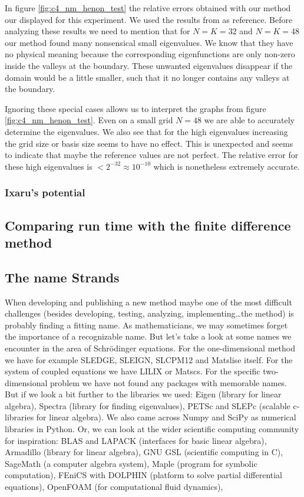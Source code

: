 In figure \ref{fig:c4_nm_henon_test} the relative errors obtained with our method our displayed for this experiment. We used the results from \cite{wang_new_2009} as reference. Before analyzing these results we need to mention that for $N = K = 32$ and $N = K = 48$ our method found many nonsensical small eigenvalues. We know that they have no physical meaning because the corresponding eigenfunctions are only non-zero inside the valleys at the boundary. These unwanted eigenvalues disappear if the domain would be a little smaller, such that it no longer contains any valleys at the boundary.

Ignoring these special cases allows us to interpret the graphs from figure \ref{fig:c4_nm_henon_test}. Even on a small grid $N = 48$ we are able to accurately determine the eigenvalues. We also see that for the high eigenvalues increasing the grid size or basis size seems to have no effect. This is unexpected and seems to indicate that maybe the reference values are not perfect. The relative error for these high eigenvalues is $< 2^{-32} \approx 10^{-10}$ which is nonetheless extremely accurate.

\subsubsection{Ixaru's potential}\label{sec:c4_numerical_ixaru}

\subsection{Comparing run time with the finite difference method}\label{sec:c4_nm_vs_fd}



\subsection{The name Strands}

When developing and publishing a new method maybe one of the most difficult challenges (besides developing, testing, analyzing, implementing\dots the method) is probably finding a fitting name. As mathematicians, we may sometimes forget the importance of a recognizable name. But let's take a look at some names we encounter in the area of Schrödinger equations. For the one-dimensional method we have for example SLEDGE, SLEIGN, SLCPM12 and Matslise itself. For the system of coupled equations we have LILIX or Matscs. For the specific two-dimensional problem we have not found any packages with memorable names. But if we look a bit further to the libraries we used: Eigen (\cpp library for linear algebra), Spectra (\cpp library for finding eigenvalues), PETSc and SLEPc (scalable c-libraries for linear algebra). We also came across Numpy and SciPy as numerical libraries in Python. Or, we can look at the wider scientific computing community for inspiration: BLAS and LAPACK (interfaces for basic linear algebra), Armadillo (\cpp library for linear algebra), GNU GSL (scientific computing in C), SageMath (a computer algebra system), Maple (program for symbolic computation), FEniCS with DOLPHIN (platform to solve partial differential equations), OpenFOAM (for computational fluid dynamics),


